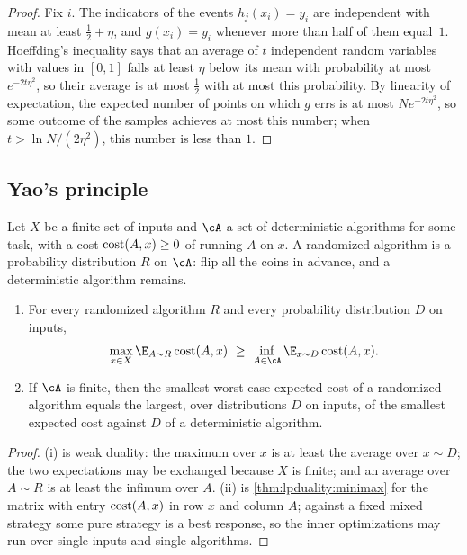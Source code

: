 \begin{refsection}
\begin{proof}
Fix $i$. The indicators of the events $h_j(x_i)=y_i$ are independent with mean at least $\frac12+\eta$, and $g(x_i)=y_i$ whenever more than half of them equal~$1$. Hoeffding's inequality says that an average of $t$ independent random variables with values in $[0,1]$ falls at least $\eta$ below its mean with probability at most $e^{-2t\eta^2}$, so their average is at most $\frac12$ with at most this probability. By linearity of expectation, the expected number of points on which $g$ errs is at most $Ne^{-2t\eta^2}$, so some outcome of the samples achieves at most this number; when $t>\ln N/(2\eta^2)$, this number is less than $1$.
\end{proof}

\subsection{Yao's principle}

Let $X$ be a finite set of inputs and $\cA$ a set of deterministic algorithms for some task, with a cost $\operatorname{cost}(A,x)\ge0$ of running $A$ on $x$. A randomized algorithm is a probability distribution $R$ on $\cA$: flip all the coins in advance, and a deterministic algorithm remains.

\begin{theorem}\label{thm:lpduality:yao}
\leavevmode
\begin{enumerate}
\item For every randomized algorithm $R$ and every probability distribution $D$ on inputs,
\[
\max_{x\in X}\E_{A\sim R}\lpcost(A,x)\ \ge\ \inf_{A\in\cA}\E_{x\sim D}\lpcost(A,x).
\]
\item If $\cA$ is finite, then the smallest worst-case expected cost of a randomized algorithm equals the largest, over distributions $D$ on inputs, of the smallest expected cost against $D$ of a deterministic algorithm.
\end{enumerate}
\end{theorem}

\begin{proof}
(i) is weak duality: the maximum over $x$ is at least the average over $x\sim D$; the two expectations may be exchanged because $X$ is finite; and an average over $A\sim R$ is at least the infimum over $A$. (ii) is \cref{thm:lpduality:minimax} for the matrix with entry $\operatorname{cost}(A,x)$ in row $x$ and column $A$; against a fixed mixed strategy some pure strategy is a best response, so the inner optimizations may run over single inputs and single algorithms.
\end{proof}


\end{refsection}
